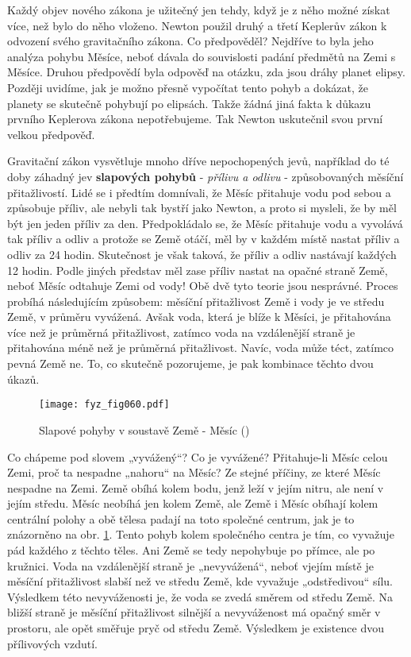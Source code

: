     Každý objev nového zákona je užitečný jen tehdy, když je z něho možné získat více, než bylo do 
    něho vloženo. Newton použil druhý a třetí Keplerův zákon k odvození svého gravitačního zákona. 
    Co předpověděl? Nejdříve to byla jeho analýza pohybu Měsíce, neboť dávala do souvislosti padání 
    předmětů na Zemi s  Měsíce. Druhou předpovědí byla odpověď na otázku, zda jsou 
    dráhy planet elipsy. Později uvidíme, jak je možno přesně vypočítat tento pohyb a dokázat, že 
    planety se skutečně pohybují po elipsách. Takže žádná jiná fakta k důkazu prvního Keplerova 
    zákona nepotřebujeme. Tak Newton uskutečnil svou první velkou předpověď.

    Gravitační zákon vysvětluje mnoho dříve nepochopených jevů, například do té doby záhadný jev 
    \textbf{slapových pohybů} - \emph{přílivu a odlivu} - způsobovaných měsíční přitažlivostí. Lidé 
    se i předtím domnívali, že Měsíc přitahuje vodu pod sebou a způsobuje příliv, ale nebyli tak 
    bystří jako Newton, a proto si mysleli, že by měl být jen jeden příliv za den. Předpokládalo 
    se, že Měsíc přitahuje vodu a vyvolává tak příliv a odliv a protože se Země otáčí, měl by v 
    každém místě nastat příliv a odliv za \num{24} hodin. Skutečnost je však taková, že příliv a 
    odliv nastávají každých \num{12} hodin. Podle jiných představ měl zase příliv nastat na opačné 
    straně Země, neboť Měsíc odtahuje Zemi od vody! Obě dvě tyto teorie jsou nesprávné. Proces 
    probíhá následujícím způsobem: měsíční přitažlivost Země i vody je ve středu Země, v průměru 
    vyvážená. Avšak voda, která je blíže k Měsíci, je přitahována více než je průměrná 
    přitažlivost, zatímco voda na vzdálenější straně je přitahována méně než je průměrná 
    přitažlivost. Navíc, voda může téct, zatímco pevná Země ne. To, co skutečně pozorujeme, je pak 
    kombinace těchto dvou úkazů.

    \begin{figure}[ht!]  %
      \centering
      \texttt{[image: fyz\_fig060.pdf]}
      \caption{Slapové pohyby v soustavě Země - Měsíc (\cite[s.~97]{Feynman01})}
      \label{fyz:fig060}
    \end{figure}
    Co chápeme pod slovem „vyvážený“? Co je vyvážené? Přitahuje-li Měsíc celou Zemi, proč ta 
    nespadne „nahoru“ na Měsíc? Ze stejné příčiny, ze které Měsíc nespadne na Zemi. Země obíhá 
    kolem bodu, jenž leží v jejím nitru, ale není v jejím středu. Měsíc neobíhá jen kolem Země, ale 
    Země i Měsíc obíhají kolem centrální polohy a obě tělesa padají na toto společné centrum, jak 
    je to znázorněno na obr. \ref{fyz:fig060}. Tento pohyb kolem společného centra je tím, co 
    vyvažuje pád každého z těchto těles. Ani Země se tedy nepohybuje po přímce, ale po kružnici. 
    Voda na vzdálenější straně je „nevyvážená“, neboť vjejím místě je měsíční přitažlivost slabší 
    než ve středu Země, kde vyvažuje „odstředivou“ sílu. Výsledkem této nevyváženosti je, že voda 
    se zvedá směrem od středu Země. Na bližší straně je měsíční přitažlivost silnější a 
    nevyváženost má opačný směr v prostoru, ale opět směřuje pryč od středu Země. Výsledkem je 
    existence dvou přílivových vzdutí.
    
